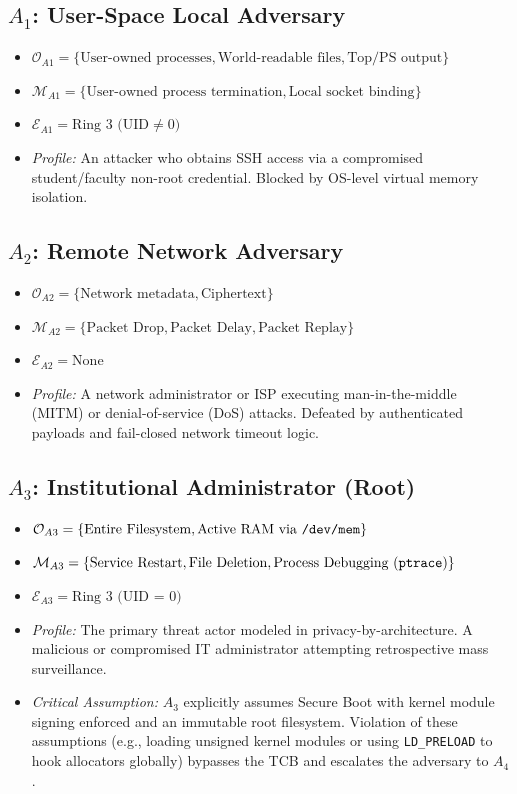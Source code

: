 \documentclass[conference]{IEEEtran}
\begin{document}
\subsection{$A_1$: User-Space Local Adversary}
\begin{itemize}
    \item $\mathcal{O}_{A1} = \{ \text{User-owned processes}, \text{World-readable files}, \text{Top/PS output} \}$
    \item $\mathcal{M}_{A1} = \{ \text{User-owned process termination}, \text{Local socket binding} \}$
    \item $\mathcal{E}_{A1} = \text{Ring 3 (UID} \neq 0\text{)}$
    \item \textit{Profile:} An attacker who obtains SSH access via a compromised student/faculty non-root credential. Blocked by OS-level virtual memory isolation.
\end{itemize}

\subsection{$A_2$: Remote Network Adversary}
\begin{itemize}
    \item $\mathcal{O}_{A2} = \{ \text{Network metadata}, \text{Ciphertext} \}$
    \item $\mathcal{M}_{A2} = \{ \text{Packet Drop}, \text{Packet Delay}, \text{Packet Replay} \}$
    \item $\mathcal{E}_{A2} = \text{None}$
    \item \textit{Profile:} A network administrator or ISP executing man-in-the-middle (MITM) or denial-of-service (DoS) attacks. Defeated by authenticated payloads and fail-closed network timeout logic.
\end{itemize}

\subsection{$A_3$: Institutional Administrator (Root)}
\begin{itemize}
    \item $\mathcal{O}_{A3} = \{ \text{Entire Filesystem}, \text{Active RAM via \texttt{/dev/mem}} \}$
    \item $\mathcal{M}_{A3} = \{ \text{Service Restart}, \text{File Deletion}, \text{Process Debugging (\texttt{ptrace})} \}$
    \item $\mathcal{E}_{A3} = \text{Ring 3 (UID = 0)}$
    \item \textit{Profile:} The primary threat actor modeled in privacy-by-architecture. A malicious or compromised IT administrator attempting retrospective mass surveillance. 
    \item \textit{Critical Assumption:} $A_3$ explicitly assumes Secure Boot with kernel module signing enforced and an immutable root filesystem. Violation of these assumptions (e.g., loading unsigned kernel modules or using \texttt{LD\_PRELOAD} to hook allocators globally) bypasses the TCB and escalates the adversary to $A_4$.
\end{itemize}
\end{document}
